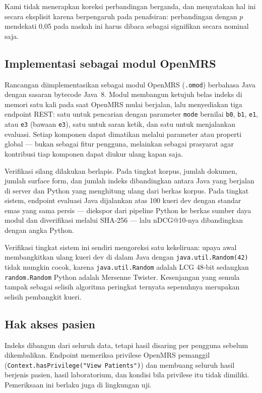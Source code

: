 \documentclass[journal,twoside,web]{ieeecolor}
\begin{document}
Kami tidak menerapkan koreksi perbandingan berganda, dan menyatakan hal ini
secara eksplisit karena berpengaruh pada penafsiran: perbandingan dengan $p$
mendekati 0,05 pada naskah ini harus dibaca sebagai signifikan secara nominal
saja.

\subsection{Implementasi sebagai modul OpenMRS}

Rancangan diimplementasikan sebagai modul OpenMRS (\texttt{.omod}) berbahasa
Java dengan sasaran bytecode Java~8. Modul membangun ketujuh belas indeks di
memori satu kali pada saat OpenMRS mulai berjalan, lalu menyediakan tiga endpoint
REST: satu untuk pencarian dengan parameter \texttt{mode} bernilai
\texttt{b0}, \texttt{b1}, \texttt{e1}, atau \texttt{e3} (bawaan \texttt{e3}),
satu untuk saran ketik, dan satu untuk menjalankan evaluasi. Setiap komponen
dapat dimatikan melalui parameter atau properti global --- bukan sebagai fitur
pengguna, melainkan sebagai prasyarat agar kontribusi tiap komponen dapat diukur
ulang kapan saja.

Verifikasi silang dilakukan berlapis. Pada tingkat korpus, jumlah dokumen,
jumlah surface form, dan jumlah indeks dibandingkan antara Java yang berjalan di
server dan Python yang menghitung ulang dari berkas korpus. Pada tingkat sistem,
endpoint evaluasi Java dijalankan atas 100 kueri dev dengan standar emas yang
sama persis --- diekspor dari pipeline Python ke berkas sumber daya modul dan
diverifikasi melalui SHA-256 --- lalu nDCG@10-nya dibandingkan dengan angka
Python.

Verifikasi tingkat sistem ini sendiri mengoreksi satu kekeliruan: upaya awal
membangkitkan ulang kueri dev di dalam Java dengan \texttt{java.util.Random(42)}
tidak mungkin cocok, karena \texttt{java.util.Random} adalah LCG 48-bit sedangkan
\texttt{random.Random} Python adalah Mersenne Twister. Kesenjangan yang semula
tampak sebagai selisih algoritma peringkat ternyata sepenuhnya merupakan selisih
pembangkit kueri.

\subsection{Hak akses pasien}

Indeks dibangun dari seluruh data, tetapi hasil disaring per pengguna sebelum
dikembalikan. Endpoint memeriksa privilese OpenMRS pemanggil
(\texttt{Context.hasPrivilege("View Patients")}) dan membuang seluruh hasil
berjenis pasien, hasil laboratorium, dan kondisi bila privilese itu tidak
dimiliki. Pemeriksaan ini berlaku juga di lingkungan uji.
\end{document}
